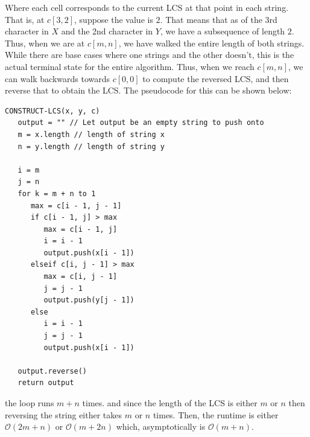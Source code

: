 \documentclass[20pt]{article} %
\begin{document}
Where each cell corresponds to the current LCS at that point in each string. That is, at $c[3,2]$, suppose the value is $2$. That means that as of the 3rd character in $X$ and the 2nd character in $Y$, we have a subsequence of length $2$.  Thus, when we are at $c[m,n]$, we have walked the entire length of both strings.  While there are base cases where one strings and the other doesn't, this is the actual terminal state for the entire algorithm. Thus, when we reach $c[m,n]$, we can walk backwards towards $c[0,0]$ to compute the reversed LCS, and then reverse that to obtain the LCS.  The pseudocode for this can be shown below:

\newpage
\begin{verbatim}
CONSTRUCT-LCS(x, y, c)
   output = "" // Let output be an empty string to push onto
   m = x.length // length of string x
   n = y.length // length of string y

   i = m
   j = n
   for k = m + n to 1
      max = c[i - 1, j - 1]
      if c[i - 1, j] > max
         max = c[i - 1, j]
         i = i - 1
         output.push(x[i - 1])
      elseif c[i, j - 1] > max
         max = c[i, j - 1]
         j = j - 1
         output.push(y[j - 1])
      else
         i = i - 1
         j = j - 1
         output.push(x[i - 1])
   
   output.reverse()
   return output
\end{verbatim}

the loop runs $m + n$ times. and since the length of the LCS is either $m$ or $n$ then reversing the string either takes $m$ or $n$ times. Then, the runtime is either $\mathcal{O}(2m + n)$ or $\mathcal{O}(m + 2n)$ which, asymptotically is $\mathcal{O}(m + n)$.
\end{document}
